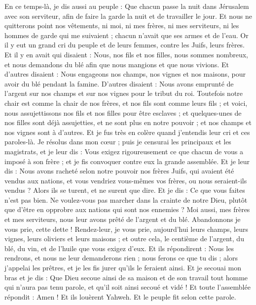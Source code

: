 \begin{multicols}{2}
En ce temps-là, je dis aussi au peuple : Que chacun passe la nuit dans Jérusalem avec son serviteur, afin de faire la garde la nuit et de travailler le jour.
Et nous ne quitterons point nos vêtements, ni moi, ni mes frères, ni mes serviteurs, ni les hommes de garde qui me suivaient ; chacun n'avait que ses armes et de l'eau.
\VerseOne{}Or il y eut un grand cri du peuple et de leurs femmes, contre les Juifs, leurs frères.
Et il y en avait qui disaient : Nous, nos fils et nos filles, nous sommes nombreux, et nous demandons du blé afin que nous mangions et que nous vivions.
Et d'autres disaient : Nous engageons nos champs, nos vignes et nos maisons, pour avoir du blé pendant la famine.
D'autres disaient : Nous avons emprunté de l'argent sur nos champs et sur nos vignes pour le tribut du roi.
Toutefois notre chair est comme la chair de nos frères, et nos fils sont comme leurs fils ; et voici, nous assujettissons nos fils et nos filles pour être esclaves ; et quelques-unes de nos filles sont déjà assujetties, et ne sont plus en notre pouvoir ; et nos champs et nos vignes sont à d'autres.
Et je fus très en colère quand j'entendis leur cri et ces paroles-là.
Je résolus dans mon cœur ; puis je censurai les principaux et les magistrats, et je leur dis : Vous exigez rigoureusement ce que chacun de vous a imposé à son frère ; et je fis convoquer contre eux la grande assemblée. 
Et je leur dis : Nous avons racheté selon notre pouvoir nos frères Juifs, qui avaient été vendus aux nations, et vous vendriez vous-mêmes vos frères, ou nous seraient-ils vendus ? Alors ils se turent, et ne surent que dire. 
Et je dis : Ce que vous faites n'est pas bien. Ne voulez-vous pas marcher dans la crainte de notre Dieu, plutôt que d'être en opprobre aux nations qui sont nos ennemies ?
Moi aussi, mes frères et mes serviteurs, nous leur avons prêté de l'argent et du blé. Abandonnons je vous prie, cette dette !
Rendez-leur, je vous prie, aujourd'hui leurs champs, leurs vignes, leurs oliviers et leurs maisons ; et outre cela, le centième de l'argent, du blé, du vin, et de l'huile que vous exigez d'eux.
Et ils répondirent : Nous les rendrons, et nous ne leur demanderons rien ; nous ferons ce que tu dis ; alors j'appelai les prêtres, et je les fis jurer qu'ils le feraient ainsi.
Et je secouai mon bras et je dis : Que Dieu secoue ainsi de sa maison et de son travail tout homme qui n'aura pas tenu parole, et qu'il soit ainsi secoué et vidé ! Et toute l'assemblée répondit : Amen ! Et ils louèrent Yahweh. Et le peuple fit selon cette parole.

\end{multicols}
